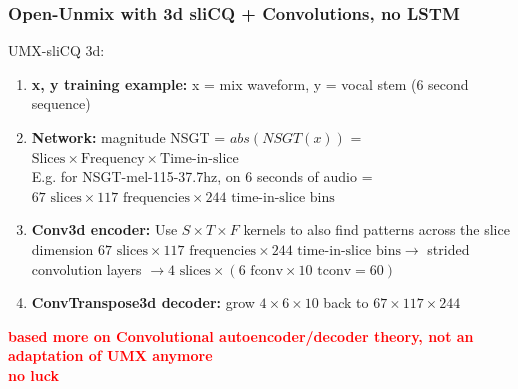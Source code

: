 \documentclass[usenames,dvipsnames]{beamer}
\begin{document}
\begin{frame}
	\frametitle{Open-Unmix with 3d sliCQ + Convolutions, no LSTM}
	UMX-sliCQ 3d:
	\begin{enumerate}
		\item
			\textbf{x, y training example:} x = mix waveform, y = vocal stem (6 second sequence)
		\item
			\textbf{Network:} magnitude NSGT = $abs(NSGT(x))$ = $\text{Slices} \times \text{Frequency} \times \text{Time-in-slice}$\\E.g. for NSGT-mel-115-37.7hz, on 6 seconds of audio = $67 \text{ slices} \times 117 \text{ frequencies} \times 244 \text{ time-in-slice bins} $
		\item
			\textbf{Conv3d encoder:} Use $S \times T \times F$ kernels to also find patterns across the slice dimension
			$67 \text{ slices} \times 117 \text{ frequencies} \times 244 \text{ time-in-slice bins} \rightarrow$ strided convolution layers $\rightarrow 4 \text{ slices} \times (6 \text { fconv} \times 10 \text { tconv} = 60)$\\
		\item
			\textbf{ConvTranspose3d decoder:} grow $4 \times 6 \times 10$ back to $67 \times 117 \times 244$
	\end{enumerate}
	\textbf{\textcolor{red}{based more on Convolutional autoencoder/decoder theory, not an adaptation of UMX anymore}}\\
	\textbf{\textcolor{red}{no luck}}\\
\end{frame}
\end{document}
